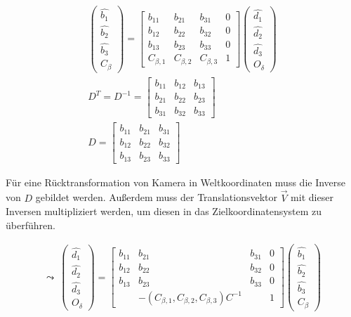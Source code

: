 	\begin{gather}
	\begin{pmatrix}
		\hat{b_1}\\
		\hat{b_2}\\
		\hat{b_3}\\
		C_\beta
	\end{pmatrix} = 
	\begin{bmatrix}
		b_{11} & b_{21} & b_{31} & 0\\
		b_{12} & b_{22} & b_{32} & 0\\
		b_{13} & b_{23} & b_{33} & 0\\
		C_{\beta,1} & C_{\beta,2} & C_{\beta,3} & 1
	\end{bmatrix}
	\begin{pmatrix}
		\hat{d_1}\\
		\hat{d_2}\\
		\hat{d_3}\\
		O_\delta
	\end{pmatrix}\\
	D^T = D^{-1}= \begin{bmatrix}
		b_{11} & b_{12} & b_{13} \\
		b_{21} & b_{22} & b_{23} \\
		b_{31} & b_{32} & b_{33} 
	\end{bmatrix}\\
	D = \begin{bmatrix}
		b_{11} & b_{21} & b_{31} \\
		b_{12} & b_{22} & b_{32} \\
		b_{13} & b_{23} & b_{33} 
	\end{bmatrix}
\end{gather}

Für eine Rücktransformation von Kamera in Weltkoordinaten muss die Inverse von $D$ gebildet werden.
Außerdem muss der Translationsvektor $\vec{V}$ mit dieser Inversen multipliziert werden, um diesen in das Zielkoordinatensystem zu überführen.


\begin{gather}
	\leadsto \: \begin{pmatrix}
		\hat{d_1}\\
		\hat{d_2}\\
		\hat{d_3}\\
		O_\delta
	\end{pmatrix} = 
	\begin{bmatrix}
		b_{11} & b_{21} & b_{31} & 0\\
		b_{12} & b_{22} & b_{32} & 0\\
		b_{13} & b_{23} & b_{33} & 0\\
		&-(	C_{\beta,1}, C_{\beta,2}, C_{\beta,3})C^{-1}& & 1
	\end{bmatrix}
	\begin{pmatrix}
		\hat{b_1}\\
		\hat{b_2}\\
		\hat{b_3}\\
		C_\beta
	\end{pmatrix}
\end{gather}


